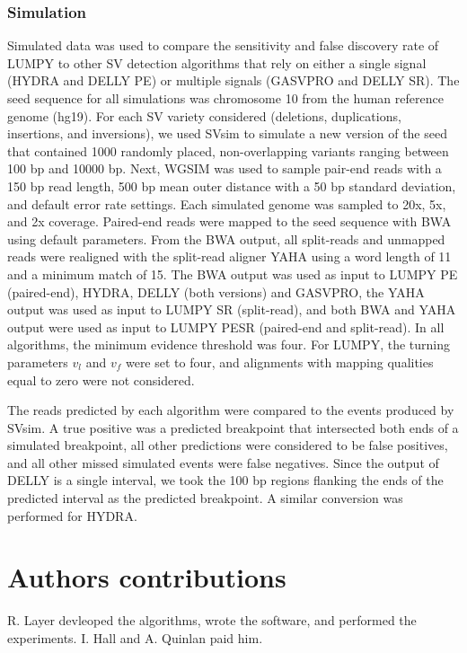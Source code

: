 \documentclass[10pt]{bmc_article}
\newenvironment{bmcformat}{\begin{raggedright}\baselineskip20pt\sloppy\setboolean{publ}{false}}{\end{raggedright}\baselineskip20pt\sloppy}
\begin{document}
\begin{bmcformat}
\subsubsection*{Simulation}

Simulated data was used to compare the sensitivity and false discovery rate of
LUMPY to other SV detection algorithms that rely on either a single signal
(HYDRA and DELLY PE) or multiple signals (GASVPRO and DELLY SR).  The seed
sequence for all simulations was chromosome 10 from the human reference genome
(hg19).  For each SV variety considered (deletions, duplications, insertions,
and inversions), we used SVsim to simulate a new version of the seed that
contained 1000 randomly placed, non-overlapping variants ranging between 100 bp
and 10000 bp. Next, WGSIM was used to sample pair-end reads with a 150 bp
read length, 500 bp mean outer distance with a 50 bp standard deviation, and
default error rate settings.  Each simulated genome was sampled to 20x, 5x, and
2x coverage. Paired-end reads were mapped to the seed sequence with BWA using
default parameters.  From the BWA output, all split-reads and unmapped reads
were realigned with the split-read aligner YAHA using a word length of 11 and a
minimum match of 15. The BWA output was used as input to LUMPY PE
(paired-end), HYDRA, DELLY (both versions) and GASVPRO, the YAHA output was used
as input to LUMPY SR (split-read), and both BWA and YAHA output were used as
input to LUMPY PESR (paired-end and split-read).  In all algorithms, the
minimum evidence threshold was four.  For LUMPY, the turning parameters $v_l$
and $v_f$ were set to four, and alignments with mapping qualities equal to zero
were not considered.

The reads predicted by each algorithm were compared to the events produced by
SVsim.  A true positive was a predicted breakpoint that intersected both ends of
a simulated breakpoint, all other predictions were considered to be false
positives, and all other missed simulated events were false negatives.  Since
the output of DELLY is a single interval, we took the 100 bp regions flanking
the ends of the predicted interval as the predicted breakpoint.  A similar
conversion was performed for HYDRA.

\section*{Authors contributions}
R. Layer devleoped the algorithms, wrote the software, and performed the
experiments.  I. Hall and A. Quinlan paid him.


\end{bmcformat}
\end{document}
